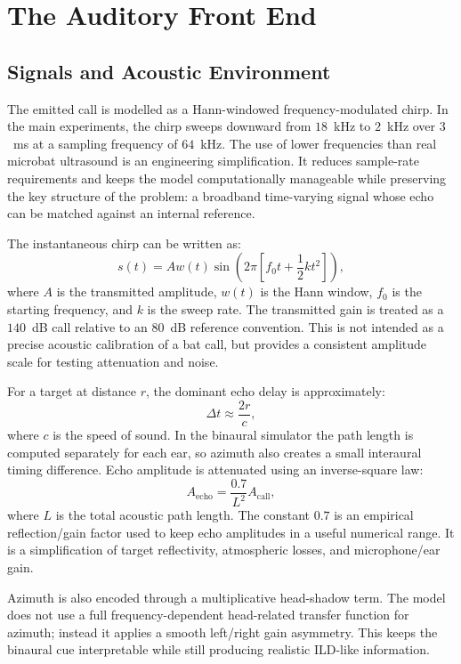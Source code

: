 \section{The Auditory Front End}

\subsection{Signals and Acoustic Environment}

The emitted call is modelled as a Hann-windowed frequency-modulated chirp. In the main experiments, the chirp sweeps downward from $18$~kHz to $2$~kHz over $3$~ms at a sampling frequency of $64$~kHz. The use of lower frequencies than real microbat ultrasound is an engineering simplification. It reduces sample-rate requirements and keeps the model computationally manageable while preserving the key structure of the problem: a broadband time-varying signal whose echo can be matched against an internal reference.

The instantaneous chirp can be written as:
\begin{equation}
    s(t) = A w(t)\sin\left(2\pi\left[f_0 t + \frac{1}{2}kt^2\right]\right),
\end{equation}
where $A$ is the transmitted amplitude, $w(t)$ is the Hann window, $f_0$ is the starting frequency, and $k$ is the sweep rate. The transmitted gain is treated as a $140$~dB call relative to an $80$~dB reference convention. This is not intended as a precise acoustic calibration of a bat call, but provides a consistent amplitude scale for testing attenuation and noise.

For a target at distance $r$, the dominant echo delay is approximately:
\begin{equation}
    \Delta t \approx \frac{2r}{c},
\end{equation}
where $c$ is the speed of sound. In the binaural simulator the path length is computed separately for each ear, so azimuth also creates a small interaural timing difference. Echo amplitude is attenuated using an inverse-square law:
\begin{equation}
    A_{\text{echo}} = \frac{0.7}{L^2}A_{\text{call}},
\end{equation}
where $L$ is the total acoustic path length. The constant $0.7$ is an empirical reflection/gain factor used to keep echo amplitudes in a useful numerical range. It is a simplification of target reflectivity, atmospheric losses, and microphone/ear gain.

Azimuth is also encoded through a multiplicative head-shadow term. The model does not use a full frequency-dependent head-related transfer function for azimuth; instead it applies a smooth left/right gain asymmetry. This keeps the binaural cue interpretable while still producing realistic ILD-like information.

